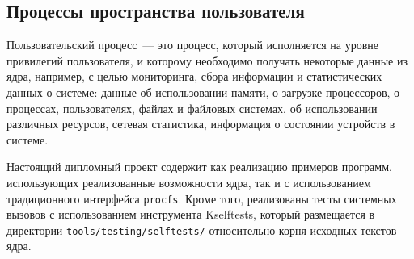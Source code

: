 \subsection{Процессы пространства пользователя}
\label{sub:sys:sys_pidfdinfo}

Пользовательский процесс~--- это процесс, который исполняется на уровне
привилегий пользователя, и которому необходимо получать некоторые данные из
ядра, например, с целью мониторинга, сбора информации и статистических данных о
системе: данные об использовании памяти, о загрузке процессоров, о процессах,
пользователях, файлах и файловых системах, об использовании различных ресурсов,
сетевая статистика, информация о состоянии устройств в системе.

Настоящий дипломный проект содержит как реализацию примеров программ,
использующих реализованные возможности ядра, так и с использованием
традиционного интерфейса \texttt{procfs}. Кроме того, реализованы тесты
системных вызовов с использованием инструмента Kselftests, который размещается в
директории \texttt{tools/testing/selftests/} относительно корня исходных текстов
ядра.
